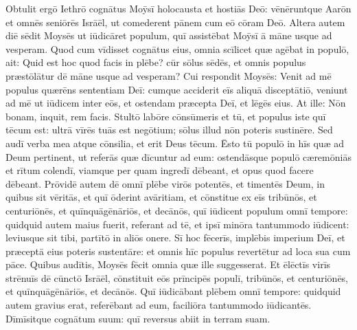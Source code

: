 Obtulit ergō Iethrō cognātus Moȳsī holocausta et hostiās Deō: vēnēruntque Aarōn et omnēs seniōrēs
Isrāēl, ut comederent pānem cum eō cōram
Deō. 
Altera autem diē sēdit Moysēs ut iūdicāret populum, quī assistēbat Moȳsī ā māne usque
ad vesperam. 
Quod cum vīdisset cognātus
eius, omnia scīlicet quæ agēbat in populō, ait: Quid est hoc quod facis in
plēbe? cūr sōlus sēdēs, et omnis populus
præstōlātur dē māne usque ad vesperam? 
Cui respondit
Moysēs: Venit ad mē populus quærēns sententiam Deī: 
cumque acciderit
eīs aliquā disceptātiō, veniunt ad mē ut
iūdicem inter eōs, et ostendam
præcepta Deī, et lēgēs eius. 
At
ille: Nōn bonam, inquit, rem facis. 
Stultō labōre cōnsūmeris et tū, et
populus iste quī tēcum est: ultrā vīrēs tuās est negōtium; sōlus illud
nōn poteris sustinēre. 
Sed audī verba mea atque cōnsilia, et erit Deus
tēcum. Ēsto tū populō in hīs quæ ad Deum pertinent, ut referās quæ
dīcuntur ad eum: 
ostendāsque populō cæremōniās et
rītum colendī,
viamque per quam ingredī dēbeant, et opus quod
facere dēbeant. 
Prōvidē autem dē omnī plēbe virōs
potentēs, et timentēs Deum, in quibus sit vēritās, et quī
ōderint avāritiam, et cōnstitue ex eīs
tribūnōs, et centuriōnēs, et
quīnquāgēnāriōs, et decānōs, 
quī
iūdicent populum omnī tempore: quidquid autem maius fuerit, referant ad
tē, et ipsī minōra tantummodo iūdicent: leviusque sit
tibi, partītō in aliōs onere.
Sī hoc fēcerīs, implēbis imperium Deī, et præceptā eius poteris
sustentāre: et omnis hīc populus revertētur ad
loca sua cum pāce. 
Quibus audītis, Moysēs fēcit omnia quæ ille
suggesserat. 
Et ēlēctīs virīs strēnuīs
dē cūnctō Isrāēl, cōnstituit eōs prīncipēs populī, tribūnōs, et
centuriōnēs, et quīnquāgēnāriōs, et decānōs. 
Quī iūdicābant
plēbem omnī tempore: quidquid autem gravius erat,
referēbant ad eum, faciliōra tantummodo iūdicantēs. 
Dīmīsitque
cognātum suum: quī reversus abiit in terram suam. 
